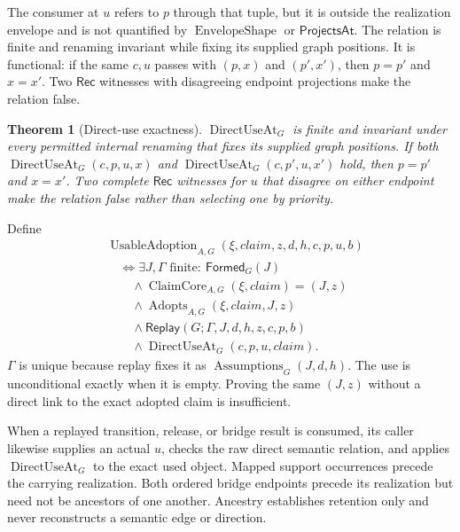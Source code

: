 \documentclass[11pt,twoside]{article}
\newcommand{\Formed}{\mathsf{Formed}}
\newcommand{\Replay}{\mathsf{Replay}}
\newcommand{\ProjectsAt}{\mathsf{ProjectsAt}}
\newcommand{\Rec}{\mathsf{Rec}}
\newtheorem{theorem}{Theorem}
\begin{document}
The consumer at \(u\) refers to \(p\) through that tuple, but it is outside the realization
envelope and is not quantified by \(\operatorname{EnvelopeShape}\) or
\(\ProjectsAt\).  The relation is finite and
renaming invariant while fixing its supplied graph positions.  It is functional:
if the same \(c,u\) passes with \((p,x)\) and \((p',x')\), then \(p=p'\) and
\(x=x'\).  Two \(\Rec\) witnesses with disagreeing endpoint projections make the
relation false.

\begin{theorem}[Direct-use exactness]\label{thm:direct-use}
\(\operatorname{DirectUseAt}_G\) is finite and invariant under every permitted
internal renaming that fixes its supplied graph positions.  If both
\(\operatorname{DirectUseAt}_G(c,p,u,x)\) and
\(\operatorname{DirectUseAt}_G(c,p',u,x')\) hold, then \(p=p'\) and \(x=x'\).
Two complete \(\Rec\) witnesses for \(u\) that disagree on either endpoint make
the relation false rather than selecting one by priority.
\end{theorem}

Define
\[
\begin{split}
 &\operatorname{UsableAdoption}_{A,G}
       (\xi,\mathit{claim},z,d,h,c,p,u,b)\\
 &\quad\Longleftrightarrow
 \exists J,\Gamma\text{ finite}:\
   \Formed_G(J)\\
 &\qquad{}\land
   \operatorname{ClaimCore}_{A,G}(\xi,\mathit{claim})=(J,z)\\
 &\qquad{}\land
   \operatorname{Adopts}_{A,G}(\xi,\mathit{claim},J,z)\\
 &\qquad{}\land
   \Replay(G;\Gamma,J,d,h,z,c,p,b)\\
 &\qquad{}\land
   \operatorname{DirectUseAt}_G(c,p,u,\mathit{claim}).
\end{split}
\]
\(\Gamma\) is unique because replay fixes it as
\(\operatorname{Assumptions}_G(J,d,h)\).  The use is unconditional exactly when
it is empty.  Proving the same \((J,z)\) without a direct link to the exact adopted
claim is insufficient.

When a replayed transition, release, or bridge result is consumed, its caller
likewise supplies an actual \(u\), checks the raw direct semantic relation, and
applies \(\operatorname{DirectUseAt}_G\) to the exact used object.  Mapped support
occurrences precede the carrying realization.  Both ordered bridge endpoints
precede its realization but need not be ancestors of one another.  Ancestry
establishes retention only and never reconstructs a semantic edge or direction.
\end{document}
